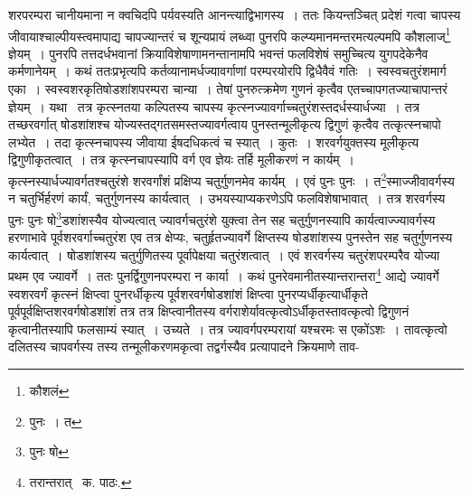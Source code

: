 \documentclass[11pt, openany]{book}
\begin{document}
\noindent शरपरम्परा चानीयमाना न क्वचिदपि पर्यवस्यति आनन्त्याद्विभागस्य~। ततः कियन्तञ्चित् प्रदेशं गत्वा चापस्य जीवायाश्चाल्पीयस्त्वमापाद्य चापज्यान्तरं च शून्यप्रायं लब्ध्वा पुनरपि कल्प्यमानमन्तरमत्यल्पमपि कौशलाज्\renewcommand{\thefootnote}{१}\footnote{कौशलं} ज्ञेयम्~। पुनरपि तत्तदर्धभवानां क्रियाविशेषाणामनन्तानामपि भवन्तं फलविशेषं समुच्चित्य युगपदेकेनैव कर्मणानेयम्~। कथं ततःप्रभृत्यपि कर्तव्यानामर्धज्यावर्गाणां परम्परयोरपि द्विधैवैवं गतिः~। स्वस्वचतुरंशमार्ग एका~। स्वस्वशरकृतिषोडशांशपरम्परा चान्या~। तेषां पुनरुत्क्रमेण गुणनं कृत्वैव एतच्चापगतज्याचापान्तरं ज्ञेयम्~। यथा \textendash\ तत्र कृत्स्नतया कल्पितस्य चापस्य कृत्स्नज्यावर्गाच्चतुरंशस्तदर्धस्यार्धज्या~। तत्र तच्छरवर्गात् षोडशांशश्च योज्यस्तद्गतसमस्तज्यावर्गत्वाय पुनस्तन्मूलीकृत्य द्विगुणं कृत्वैव तत्कृत्स्नचापो लभ्येत~। तदा कृत्स्नचापस्य जीवाया ईषदधिकत्वं च स्यात्~। कुतः~। शरवर्गयुक्तस्य मूलीकृत्य द्विगुणीकृतत्वात्~। तत्र कृत्स्नचापस्यापि वर्ग एव ज्ञेयः तर्हि मूलीकरणं न कार्यम्~।
कृत्स्नस्यार्धज्यावर्गतश्चतुरंशे शरवर्गांशं प्रक्षिप्य चतुर्गुणनमेव कार्यम्~। एवं पुनः पुनः~। त\renewcommand{\thefootnote}{२}\footnote{पुनः~। त}स्माज्जीवावर्गस्य न चतुर्भिर्हरणं कार्यं, चतुर्गुणनस्य कार्यत्वात्~। उभयस्याप्यकरणेऽपि फलविशेषाभावात्~। तत्र शरवर्गस्य पुनः पुनः षो\renewcommand{\thefootnote}{३}\footnote{पुनः षो}डशांशस्यैव योज्यत्वात् ज्यावर्गचतुरंशे युक्त्वा तेन सह चतुर्गुणनस्यापि कार्यत्वाज्ज्यावर्गस्य हरणाभावे पूर्वशरवर्गाच्चतुरंश एव तत्र क्षेप्यः, चतुर्हृतज्यावर्गे क्षिप्तस्य षोडशांशस्य पुनस्तेन सह चतुर्गुणनस्य कार्यत्वात्~। षोडशांशस्य चतुर्गुणितस्य पूर्वापेक्षया चतुरंशत्वात्~। एवं शरवर्गस्य चतुरंशपरम्परैव योज्या प्रथम एव ज्यावर्गे~। ततः पुनर्द्विगुणनपरम्परा न कार्या~। कथं पुनरेवमानीतस्यान्तरान्तरा\renewcommand{\thefootnote}{४}\footnote{तरान्तरात् \textendash\ क. पाठः.} आद्ये ज्यावर्गे स्वशरवर्गं कृत्स्नं क्षिप्त्वा पुनरर्धीकृत्य पूर्वशरवर्गषोडशांशं क्षिप्त्वा
पुनरप्यर्धीकृत्यार्धीकृते पूर्वपूर्वक्षिप्तशरवर्गषोडशांशं तत्र तत्र क्षिप्त्वानीतस्य वर्गराशेर्यावत्कृत्वोऽर्धीकृतस्तावत्कृत्वो द्विगुणनं कृत्वानीतस्यापि फलसाम्यं स्यात्~। उच्यते~। तत्र ज्यावर्गपरम्परायां यश्चरमः स एकोंऽशः~। तावत्कृत्वो दलितस्य चापवर्गस्य तस्य तन्मूलीकरणमकृत्वा तद्वर्गस्यैव प्रत्यापादने क्रियमाणे ताव-

\newpage
\end{document}
